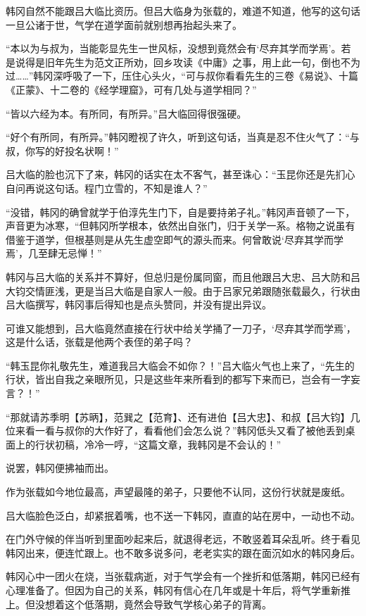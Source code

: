 韩冈自然不能跟吕大临比资历。但吕大临身为张载的，难道不知道，他写的这句话一旦公诸于世，气学在道学面前就别想再抬起头来了。

“本以为与叔为，当能彰显先生一世风标，没想到竟然会有‘尽弃其学而学焉’。若是说得是旧年先生为范文正所劝，回乡攻读《中庸》之事，用上此一句，倒也不为过……”韩冈深呼吸了一下，压住心头火，“可与叔你看看先生的三卷《易说》、十篇《正蒙》、十二卷的《经学理窟》，可有几处与道学相同？”

“皆以六经为本。有所同，有所异。”吕大临回得很强硬。

“好个有所同，有所异。”韩冈瞪视了许久，听到这句话，当真是忍不住火气了：“与叔，你写的好投名状啊！”

吕大临的脸也沉下了来，韩冈的话实在太不客气，甚至诛心：“玉昆你还是先扪心自问再说这句话。程门立雪的，不知是谁人？”

“没错，韩冈的确曾就学于伯淳先生门下，自是要持弟子礼。”韩冈声音顿了一下，声音更为冰寒，“但韩冈所学根本，依然出自张门，归于关学一系。格物之说虽有借鉴于道学，但根基则是从先生虚空即气的源头而来。何曾敢说‘尽弃其学而学焉’，几至肆无忌惮！”

韩冈与吕大临的关系并不算好，但总归是份属同窗，而且他跟吕大忠、吕大防和吕大钧交情匪浅，更是当吕大临是自家人一般。由于吕家兄弟跟随张载最久，行状由吕大临撰写，韩冈事后得知也是点头赞同，并没有提出异议。

可谁又能想到，吕大临竟然直接在行状中给关学捅了一刀子，‘尽弃其学而学焉’，这是什么话，张载是他两个表侄的弟子吗？

“韩玉昆你礼敬先生，难道我吕大临会不如你？！”吕大临火气也上来了，“先生的行状，皆出自我之亲眼所见，只是这些年来所看到的都写下来而已，岂会有一字妄言？！”

“那就请苏季明【苏昞】，范巽之【范育】、还有进伯【吕大忠】、和叔【吕大钧】几位来看一看与叔你的大作好了，看看他们会怎么说？”韩冈低头又看了被他丢到桌面上的行状初稿，冷冷一哼，“这篇文章，我韩冈是不会认的！”

说罢，韩冈便拂袖而出。

作为张载如今地位最高，声望最隆的弟子，只要他不认同，这份行状就是废纸。

吕大临脸色泛白，却紧抿着嘴，也不送一下韩冈，直直的站在房中，一动也不动。

在门外守候的伴当听到里面吵起来后，就退得老远，不敢竖着耳朵乱听。终于看见韩冈出来，便连忙跟上。也不敢多说多问，老老实实的跟在面沉如水的韩冈身后。

韩冈心中一团火在烧，当张载病逝，对于气学会有一个挫折和低落期，韩冈已经有心理准备了。但因为自己的关系，韩冈有信心在几年或是十年后，将气学重新推上。但没想着这个低落期，竟然会导致气学核心弟子的背离。

